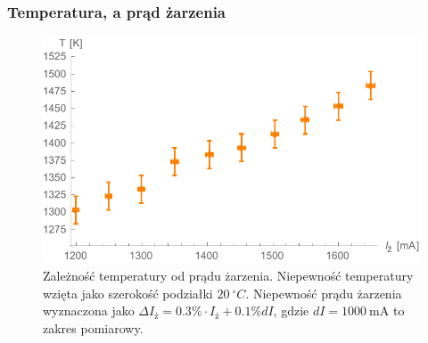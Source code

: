 \documentclass[paper=a4, fontsize=12pt]{scrartcl}
\begin{document}
\subsubsection{Temperatura, a prąd żarzenia}
\begin{figure}[h!]
\centering
\includegraphics[width=0.8\linewidth]{tiz}
\caption{Zależność temperatury od prądu żarzenia. \newline Niepewność temperatury wzięta jako szerokość podziałki $20\:^\circ C$. Niepewność prądu żarzenia wyznaczona jako $\Delta I_\mathrm{ż}=0.3\%\cdot I_\mathrm{ż}+0.1\%dI$, gdzie $dI=1000\:\mathrm{mA}$ to zakres pomiarowy.}
\label{fig:tiz}
\end{figure}
\end{document}
